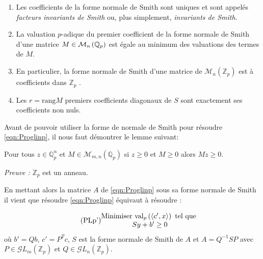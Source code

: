 \begin{remarques}

	
	\begin{enumerate}[label=\roman*.]
		\item Les coefficients de la forme normale de Smith sont uniques et sont appelés \textit{facteurs invariants de Smith} ou, plus simplement, \textit{invariants de Smith}.
		\item La valuation $p$-adique du premier coefficient de la forme normale de Smith d'une matrice $M \in \mathcal{M}_n \left( \mathbb{Q}_p \right) $ est égale au minimum des valuations des termes de $M$.
		\item En particulier, la forme normale de Smith d'une matrice de $\mathcal{M}_n \left( \mathbb{Z}_p \right) $ est à coefficients dans $\mathbb{Z}_p$ .
		\item Les $r = \text{rang} M$ premiers coefficients diagonaux de $S$ sont exactement ses coefficients non nuls.
	\end{enumerate}

\end{remarques}


Avant de pouvoir utiliser la forme de normale de Smith pour résoudre \ref{eqn:Proglinp}, il nous faut démontrer le lemme suivant:

\begin{lemme}
Pour tous $z \in \mathbb{Q}_{ p } ^n$ et $M \in \mathcal{M}_{m,n}\left( \mathbb{Q}_{ p }  \right)  $ si $z\ge 0$ et $M\ge 0$ alors $Mz\ge 0$.  
\end{lemme}
\textit{Preuve :} $\mathbb{Z}_p$ est un anneau. \hfill\qedsymbol



En mettant alors la matrice $A$ de \ref{eqn:Proglinp} sous sa forme normale de Smith il vient que résoudre \ref{eqn:Proglinp} équivaut à résoudre :    


\begin{equation}
	  \tag{PLp'}
\begin{matrix}
	\text{Minimiser } \text{val}_p\left(\left<c',x \right>\right) \text{ tel que }\\
	Sy + b' \ge 0
 \end{matrix}
	    \label{eqn:Proglinp2}
\end{equation}
où $b' = Qb$, $c' = P^Tc$, $S$ est la forme normale de Smith de $A$ et $A = Q^{-1} S P$ avec $P \in \mathcal{G}L_m\left( \mathbb{Z}_p \right)$ et $ Q \in \mathcal{G}L_n\left( \mathbb{Z}_p \right)$.

